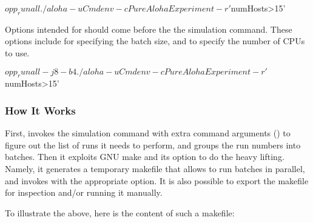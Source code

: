 \begin{commandline}
$ opp_runall ./aloha -u Cmdenv -c PureAlohaExperiment -r '$numHosts>15'
\end{commandline}

Options intended for  should come before the the simulation
command. These options include  for specifying the batch size, and
 to specify the number of CPUs to use.

\begin{commandline}
$ opp_runall -j8 -b4 ./aloha -u Cmdenv -c PureAlohaExperiment -r '$numHosts>15'
\end{commandline}


\subsubsection{How It Works}
\label{sec:run-sim:opp-runall:operation}

First,  invokes the simulation command with extra command
arguments () to figure out the list of runs it needs to
perform, and groups the run numbers into batches. Then it exploits GNU make and
its  option to do the heavy lifting. Namely, it generates a
temporary makefile that allows  to run batches in parallel, and
invokes  with the appropriate  option. It is also possible
to export the makefile for inspection and/or running it manually.

To illustrate the above, here is the content of such a makefile:




